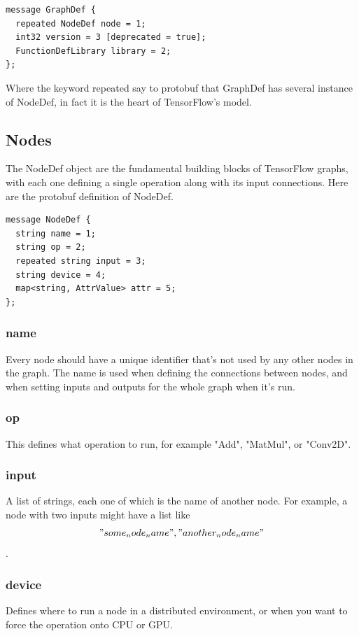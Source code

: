 \documentclass[11pt,openany]{book}
\begin{document}
\begin{verbatim}
message GraphDef {
  repeated NodeDef node = 1;
  int32 version = 3 [deprecated = true];
  FunctionDefLibrary library = 2;
};
\end{verbatim}

Where the keyword repeated say to protobuf that GraphDef has several instance of NodeDef, in fact it is the heart of TensorFlow's model.

\subsection{Nodes}

The NodeDef object  are the fundamental building blocks of TensorFlow graphs, with each one defining a single operation along with its input connections. Here are the protobuf definition of NodeDef.

\begin{verbatim}
message NodeDef {
  string name = 1;
  string op = 2;
  repeated string input = 3;
  string device = 4;
  map<string, AttrValue> attr = 5;
};
\end{verbatim}

\subsubsection{name}
Every node should have a unique identifier that's not used by any other nodes in the graph. The name is used when defining the connections between nodes, and when setting inputs and outputs for the whole graph when it's run.

\subsubsection{op}
This defines what operation to run, for example "Add", "MatMul", or "Conv2D".

\subsubsection{input}
A list of strings, each one of which is the name of another node. For example, a node with two inputs might have a list like \["some_node_name", "another_node_name"\].

\subsubsection{device}
Defines where to run a node in a distributed environment, or when you want to force the operation onto CPU or GPU.
\end{document}
